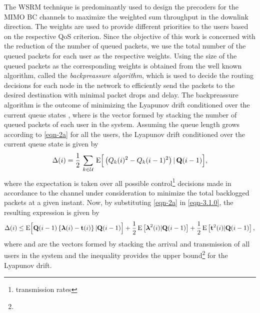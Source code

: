 
The \ac{WSRM} technique is predominantly used to design the precoders for the \ac{MIMO} \ac{BC} channels to maximize the weighted sum throughput in the downlink direction. The weights are used to provide different priorities to the users based on the respective \ac{QoS} criterion. Since the objective of this work is concerned with the reduction of the number of queued packets, we use the total number of the queued packets for each user as the respective weights. Using the size of the queued packets as the corresponding weights is obtained from the well known algorithm, called the \textit{backpreassure algorithm}, which is used to decide the routing decisions for each node in the network to efficiently send the packets to the desired destination with minimal packet drops and delay. The backpreassure algorithm is the outcome of minimizing the Lyapunov drift \cite{neely2010stochastic} conditioned over the current queue states , where  is the vector formed by stacking the number of queued packets of each user in the system. Assuming the queue length grows according to \eqref{eqn-2a} for all the users, the Lyapunov drift conditioned over the current queue state is given by
\begin{equation} \label{eqn-3.1.0}
\Delta(i) = \frac{1}{2} \, \sum_{k \in \mc{U}} \, \mathrm{E} \Big{[}  \left ( Q_k(i)^2 - Q_k(i-1)^2 \right ) \vert \, \mbf{Q}(i - 1) \Big{]},
\end{equation}
where the expectation is taken over all possible control\footnote{transmission rates} decisions made in accordance to the channel under consideration to minimize the total backlogged packets at a given instant. Now, by substituting \eqref{eqn-2a} in \eqref{eqn-3.1.0}, the resulting expression is given by
\begin{equation}
\Delta(i) \leq \mathrm{E} \Big{[} \mbf{Q}(i-1) \left \lbrace \mbfa{\lambda}(i) - \mbf{t}(i) \right \rbrace | \mbf{Q}(i-1) \Big{]} + \frac{1}{2} \,\mathrm{E} \left [ \mbfa{\lambda}^2(i) | \mbf{Q}(i-1) \right ] + \frac{1}{2} \,\mathrm{E} \left [ \mbf{t}^2(i) | \mbf{Q}(i-1) \right ],
\label{drift-exp}
\end{equation}
where \me{\mbfa{\lambda}} and  are the vectors formed by stacking the arrival and transmission of all users in the system and the inequality provides the upper bound\footnote{} for the Lyapunov drift.

